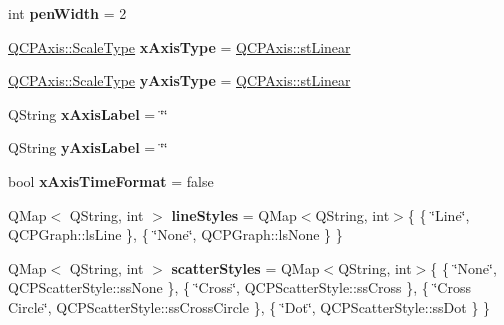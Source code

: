 \begin{DoxyCompactItemize}
\item 
\mbox{\label{structplotformat_af86c0efacb986d4267e1e46f84748818}} 
int {\bfseries pen\+Width} = 2
\item 
\mbox{\label{structplotformat_a13d9f6997001a742e85b1c22a2fd265b}} 
\hyperlink{class_q_c_p_axis_a36d8e8658dbaa179bf2aeb973db2d6f0}{Q\+C\+P\+Axis\+::\+Scale\+Type} {\bfseries x\+Axis\+Type} = \hyperlink{class_q_c_p_axis_a36d8e8658dbaa179bf2aeb973db2d6f0aff6e30a11a828bc850caffab0ff994f6}{Q\+C\+P\+Axis\+::st\+Linear}
\item 
\mbox{\label{structplotformat_aea1c58aee31f959a4cb5a5a97d167b78}} 
\hyperlink{class_q_c_p_axis_a36d8e8658dbaa179bf2aeb973db2d6f0}{Q\+C\+P\+Axis\+::\+Scale\+Type} {\bfseries y\+Axis\+Type} = \hyperlink{class_q_c_p_axis_a36d8e8658dbaa179bf2aeb973db2d6f0aff6e30a11a828bc850caffab0ff994f6}{Q\+C\+P\+Axis\+::st\+Linear}
\item 
\mbox{\label{structplotformat_a4e13c093d7e26fd7c18d4c53b5c3baa8}} 
Q\+String {\bfseries x\+Axis\+Label} = \char`\"{}\char`\"{}
\item 
\mbox{\label{structplotformat_a2d5baf9b4b5ecc7e10a7141caee1c842}} 
Q\+String {\bfseries y\+Axis\+Label} = \char`\"{}\char`\"{}
\item 
\mbox{\label{structplotformat_a211e0dcb42b5e62284b17947b2204406}} 
bool {\bfseries x\+Axis\+Time\+Format} = false
\item 
\mbox{\label{structplotformat_adb104a48fb00afa20f88de128400c923}} 
Q\+Map$<$ Q\+String, int $>$ {\bfseries line\+Styles} = Q\+Map$<$Q\+String, int$>$\{ \{ \char`\"{}Line\char`\"{}, Q\+C\+P\+Graph\+::ls\+Line \}, \{ \char`\"{}None\char`\"{}, Q\+C\+P\+Graph\+::ls\+None \} \}
\item 
\mbox{\label{structplotformat_ae7781793eb7a877f8e7a39f0d81a2194}} 
Q\+Map$<$ Q\+String, int $>$ {\bfseries scatter\+Styles} = Q\+Map$<$Q\+String, int$>$\{ \{ \char`\"{}None\char`\"{}, Q\+C\+P\+Scatter\+Style\+::ss\+None \}, \{ \char`\"{}Cross\char`\"{}, Q\+C\+P\+Scatter\+Style\+::ss\+Cross \}, \{ \char`\"{}Cross Circle\char`\"{}, Q\+C\+P\+Scatter\+Style\+::ss\+Cross\+Circle \}, \{ \char`\"{}Dot\char`\"{}, Q\+C\+P\+Scatter\+Style\+::ss\+Dot \} \}

\end{DoxyCompactItemize}
